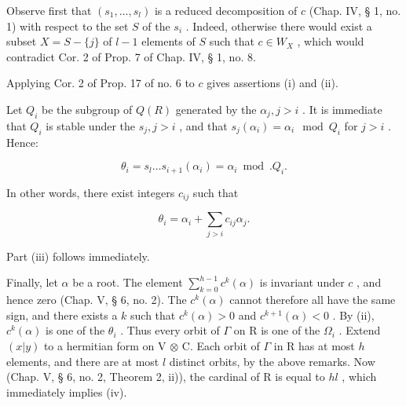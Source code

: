 Observe first that \((s_1, \ldots, s_l)\) is a reduced decomposition of \(c\) (Chap. IV, § 1, no. 1) with respect to the set \(S\) of the \(s_i\) . Indeed, otherwise there would exist a subset \(X = S - \{j\}\) of \(l - 1\) elements of \(S\) such that \(c \in W_X\) , which would contradict Cor. 2 of Prop. 7 of Chap. IV, § 1, no. 8.

Applying Cor. 2 of Prop. 17 of no. 6 to \(c\) gives assertions (i) and (ii).

Let \(Q_{i}\) be the subgroup of \(Q(R)\) generated by the \(\alpha_{j}, j > i\) . It is immediate that \(Q_{i}\) is stable under the \(s_{j}, j > i\) , and that \(s_{j}(\alpha_{i}) = \alpha_{i} \mod Q_{i}\) for \(j > i\) . Hence:

\[
\theta_ {i} = s _ {l} \dots s _ {i + 1} (\alpha_ {i}) = \alpha_ {i} \bmod . Q _ {i}.
\]

In other words, there exist integers \(c_{ij}\) such that

\[
\theta_ {i} = \alpha_ {i} + \sum_ {j > i} c _ {i j} \alpha_ {j}.
\]

Part (iii) follows immediately.

Finally, let \(\alpha\) be a root. The element \(\sum_{k=0}^{h-1} c^k(\alpha)\) is invariant under \(c\) , and hence zero (Chap. V, § 6, no. 2). The \(c^k(\alpha)\) cannot therefore all have the same sign, and there exists a \(k\) such that \(c^k(\alpha) > 0\) and \(c^{k+1}(\alpha) < 0\) . By (ii), \(c^k(\alpha)\) is one of the \(\theta_i\) . Thus every orbit of \(\Gamma\) on R is one of the \(\Omega_i\) . Extend \((x|y)\) to a hermitian form on V \(\otimes\) C. Each orbit of \(\Gamma\) in R has at most \(h\) elements, and there are at most \(l\) distinct orbits, by the above remarks. Now (Chap. V, § 6, no. 2, Theorem 2, ii)), the cardinal of R is equal to \(hl\) , which immediately implies (iv).
